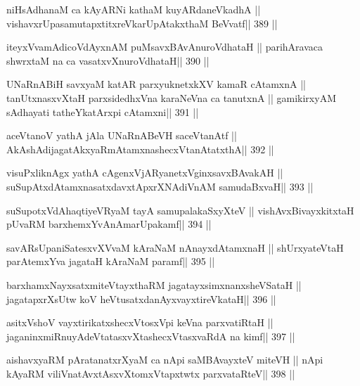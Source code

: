 \begin{shl}
niHsAdhanaM ca kAyARNi kathaM kuyARdaneVkadhA ||
vishavxrUpasamutapxtitxreVkarUpAtakxthaM BeVvatf\hfill || 389 ||
\end{shl}

\begin{shl}
iteyxVvamAdicoVdAyxnAM puMsavxBAvAnuroVdhataH ||
parihAravaca shwrxtaM na ca vasatxvXnuroVdhataH\hfill || 390 ||
\end{shl}

\begin{shl}
UNaRnABiH savxyaM katAR parxyuknetxkXV kamaR cA\s\s tamxnA ||
tanUtxnasxvXtaH parxsidedhxVna karaNeVna ca tanutxnA ||
gamikirxyAM sAdhayati tatheYkatArxpi cA\s\s tamxni\hfill || 391 ||
\end{shl}

\begin{shl}
aceVtanoV yathA jAla UNaRnABeVH saceVtanAtf ||
AkAshAdijagatAkxyaRmAtamxnashecxVtanAtatxthA\hfill || 392 ||
\end{shl}

\begin{shl}
visuPxliknAgx yathA cAgenxVjARyanetxV\s ginxsavxBAvakAH ||
suSupAtxdAtamxnasatxdavxtApxrXNAdiVnAM samudaBxvaH\hfill || 393 ||
\end{shl}

\begin{shl}
suSupotxVdAhaqtiyeVRyaM tayA samupalakaSxyXteV ||
vishAvxBivayxkitxtaH pUvaRM barxhemxYvAnAmarUpakamf\hfill || 394 ||
\end{shl}

\begin{shl}
savARsUpaniSatesxvXVvaM kAraNaM nAnayxdAtamxnaH ||
shUrxyateV\s taH parAtemxYva jagataH kAraNaM paramf\hfill || 395 ||
\end{shl}

\begin{shl}
barxhamxNayxsatxmiteV\s tayxthaRM jagatayxsimxnanxsheVSataH ||
jagatapxrXsUtw koV heVtusatxdanAyxvayxtireVkataH\hfill || 396 ||
\end{shl}

\begin{shl}
asitxVshoV vayxtirikatxshecxVtosxV\s pi keVna parxvatiRtaH ||
jaganinxmiRnuyAdeVtatasxvXtashecxVtasxvaRdA na kimf\hfill || 397 ||
\end{shl}

\begin{shl}
aishavxyaRM pAratanatxrXyaM ca nApi saMBAvayxteV miteVH ||
nApi kAyaRM viliVnatAvxtAsxvXtomxVtapxtwtx parxvataRteV\hfill || 398 ||
\end{shl}

